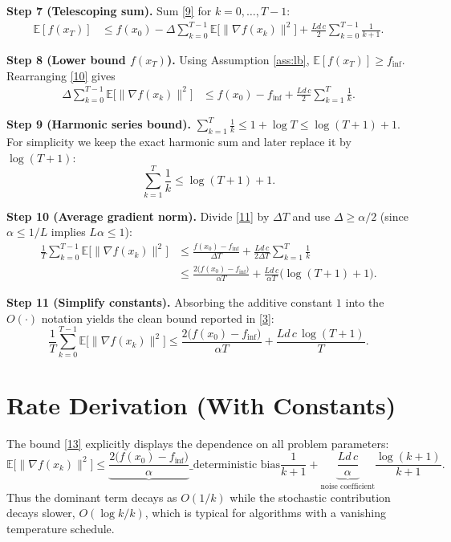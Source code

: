 \documentclass{article}
\newcommand{\E}{\mathbb{E}}
\begin{document}
\noindent\textbf{Step 7 (Telescoping sum).}  
Sum \eqref{9} for $k=0,\dots,T-1$:
\begin{align}
\E[f(x_{T})]
&\le f(x_{0})
   -\Delta\sum_{k=0}^{T-1}\E\!\big[\|\nabla f(x_{k})\|^{2}\big]
   +\frac{L d\,c}{2}\sum_{k=0}^{T-1}\frac{1}{k+1}.
\tag{10}
\end{align}

\noindent\textbf{Step 8 (Lower bound $f(x_{T})$).}
Using Assumption \ref{ass:lb}, $\E[f(x_{T})]\ge f_{\inf}$. Rearranging \eqref{10} gives
\begin{align}
\Delta\sum_{k=0}^{T-1}\E\!\big[\|\nabla f(x_{k})\|^{2}\big]
&\le f(x_{0})-f_{\inf}
   +\frac{L d\,c}{2}\sum_{k=1}^{T}\frac{1}{k}.
\tag{11}
\end{align}

\noindent\textbf{Step 9 (Harmonic series bound).}  
$\displaystyle\sum_{k=1}^{T}\frac{1}{k}\le 1+\log T\le\log (T+1)+1$. For simplicity we keep the exact harmonic sum and later replace it by $\log(T+1)$:
\[
\sum_{k=1}^{T}\frac{1}{k}\le\log (T+1)+1.
\tag{12}
\]

\noindent\textbf{Step 10 (Average gradient norm).}
Divide \eqref{11} by $\Delta T$ and use $\Delta\ge\alpha/2$ (since $\alpha\le 1/L$ implies $L\alpha\le1$):
\begin{align}
\frac{1}{T}\sum_{k=0}^{T-1}\E\!\big[\|\nabla f(x_{k})\|^{2}\big]
&\le \frac{f(x_{0})-f_{\inf}}{\Delta T}
   +\frac{L d\,c}{2\Delta T}\sum_{k=1}^{T}\frac{1}{k} \nonumber\\
&\le \frac{2\big(f(x_{0})-f_{\inf}\big)}{\alpha T}
   +\frac{L d\,c}{\alpha T}\big(\log (T+1)+1\big).
\tag{13}
\end{align}

\noindent\textbf{Step 11 (Simplify constants).}  
Absorbing the additive constant $1$ into the $O(\cdot)$ notation yields the clean bound reported in \eqref{3}:
\[
\frac{1}{T}\sum_{k=0}^{T-1}\E\!\big[\|\nabla f(x_{k})\|^{2}\big]
\le
\frac{2\big(f(x_{0})-f_{\inf}\big)}{\alpha T}
+\frac{L d\,c\,\log (T+1)}{T}.
\]
\hfill\qedsymbol

\section*{Rate Derivation (With Constants)}
The bound \eqref{13} explicitly displays the dependence on all problem parameters:
\[
\boxed{
\mathbb{E}\!\big[\|\nabla f(x_{k})\|^{2}\big]
\le
\underbrace{\frac{2\big(f(x_{0})-f_{\inf}\big)}{\alpha}}\_{\text{deterministic bias}}
\frac{1}{k+1}
+
\underbrace{\frac{L d\,c}{\alpha}}_{\text{noise coefficient}}
\frac{\log (k+1)}{k+1}.
}
\]
Thus the dominant term decays as $O(1/k)$ while the stochastic contribution decays slower, $O(\log k/k)$, which is typical for algorithms with a vanishing temperature schedule.
\end{document}

